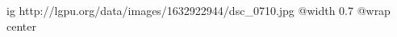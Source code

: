  
 
 
 
 

\ifcmt
  ig http://lgpu.org/data/images/1632922944/dsc_0710.jpg
  @width 0.7
	@wrap center
\fi
